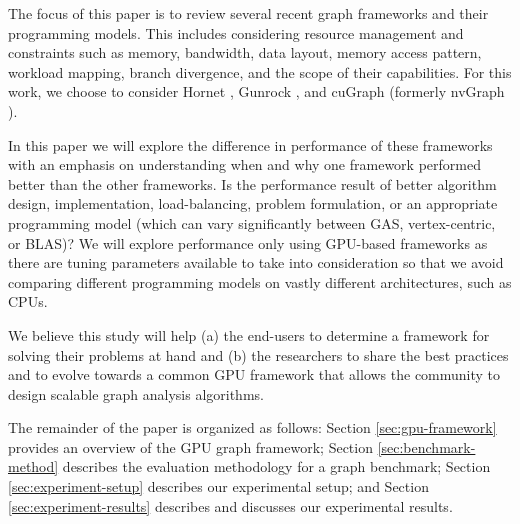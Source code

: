 The focus of this paper is to review several recent graph frameworks and their programming models. This includes considering resource management and constraints such as memory, bandwidth, data layout, memory access pattern, workload mapping, branch divergence, and the scope of their capabilities. For this work, we choose to consider Hornet \cite{green-hornet}, Gunrock \cite{wang2015gunrock}, and cuGraph (formerly nvGraph \cite{nvGraph}). 

In this paper we will explore the difference in performance of these frameworks with an emphasis on understanding when and why one framework performed better than the other  frameworks. Is the performance result of better algorithm design, implementation, load-balancing, problem formulation, or an appropriate programming model (which can vary significantly between GAS, vertex-centric, or BLAS)?  We will explore performance only using GPU-based frameworks as there are tuning parameters available to take into consideration so that we avoid comparing different programming models on vastly different architectures, such as CPUs.



We believe this study will help (a) the end-users to determine a framework for solving their problems at hand and (b) the researchers to share the best practices and to evolve towards a common GPU framework that allows the community to design scalable graph analysis algorithms. 


The remainder of the paper is organized as follows: Section \ref{sec:gpu-framework} provides an overview of the GPU graph framework; Section \ref{sec:benchmark-method} describes the evaluation methodology for a graph benchmark; Section \ref{sec:experiment-setup} describes our experimental setup; and Section \ref{sec:experiment-results} describes and discusses our experimental results.






